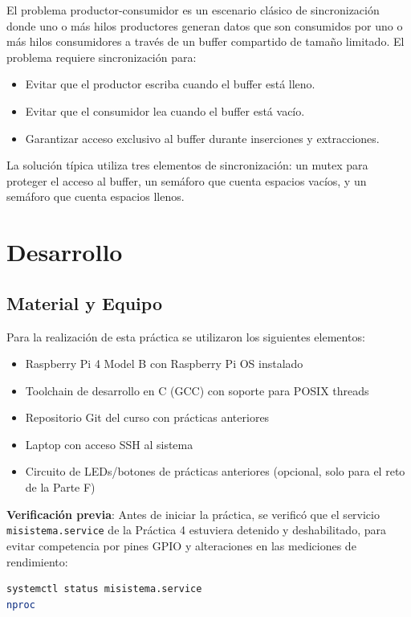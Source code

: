 \documentclass[conference]{IEEEtran}
\begin{document}
El problema productor-consumidor es un escenario clásico de sincronización donde uno o más hilos productores generan datos que son consumidos por uno o más hilos consumidores a través de un buffer compartido de tamaño limitado. El problema requiere sincronización para:

\begin{itemize}
	\item Evitar que el productor escriba cuando el buffer está lleno.
	\item Evitar que el consumidor lea cuando el buffer está vacío.
	\item Garantizar acceso exclusivo al buffer durante inserciones y extracciones.
\end{itemize}

La solución típica utiliza tres elementos de sincronización: un mutex para proteger el acceso al buffer, un semáforo que cuenta espacios vacíos, y un semáforo que cuenta espacios llenos.

\section{Desarrollo}

\subsection{Material y Equipo}

Para la realización de esta práctica se utilizaron los siguientes elementos:

\begin{itemize}
	\item Raspberry Pi 4 Model B con Raspberry Pi OS instalado
	\item Toolchain de desarrollo en C (GCC) con soporte para POSIX threads
	\item Repositorio Git del curso con prácticas anteriores
	\item Laptop con acceso SSH al sistema
	\item Circuito de LEDs/botones de prácticas anteriores (opcional, solo para el reto de la Parte F)
\end{itemize}

\textbf{Verificación previa}: Antes de iniciar la práctica, se verificó que el servicio \texttt{misistema.service} de la Práctica 4 estuviera detenido y deshabilitado, para evitar competencia por pines GPIO y alteraciones en las mediciones de rendimiento:

\begin{lstlisting}[language=bash]
systemctl status misistema.service
nproc
\end{lstlisting}
\end{document}
